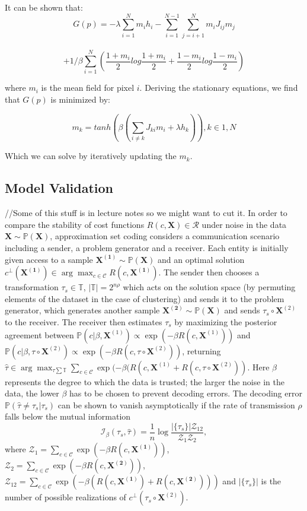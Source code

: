 \documentclass[9pt,parskip]{scrartcl}
\begin{document}
\begin{multicols*}{4}
 It can be shown that:
 $$G(p) = -\lambda \sum_{i=1}^N m_i h_i - \sum_{i=1}^{N-1} \sum_{j=i+1}^N m_i J_{ij} m_j$$ \\ $$+ 1/\beta \sum_{i=1}^N (\frac{1 + m_i}{2}log \frac{1 + m_i}{2} + \frac{1 - m_i}{2}log\frac{1 - m_i}{2})$$

where $m_i$ is the mean field for pixel $i$.
Deriving the stationary equations, we find that $G(p)$ is minimized by:
 
 $$m_k = tanh(\beta(\sum_{i\neq k} J_{ki} m_i + \lambda h_k)), k \in {1,N}$$
 
 Which we can solve by iteratively updating the $m_k$.
 
 \subsection*{Model Validation}
 //Some of this stuff is in lecture notes so we might want to cut it.
 In order to compare the stability of cost functions $R(c, \mathbf{X}) \in \mathcal{R}$ under noise in the data $\mathbf{X} \sim \mathbb{P}(\mathbf{X})$, approximation set coding considers a communication scenario including a sender, a problem generator and a receiver. Each entity is initially given access to a sample $\mathbf{X^{(1)}} \sim \mathbb{P}(\mathbf{X})$ and an optimal solution $c^\bot(\mathbf{X^{(1)}}) \in \arg \max_{c\in\mathcal{C}} R(c, \mathbf{X^{(1)}})$. The sender then chooses a transformation $\tau_s \in \mathbb{T}$, $|\mathbb{T}| = 2^{n\rho}$ which acts on the solution space (by permuting elements of the dataset in the case of clustering) and sends it to the problem generator, which generates another sample $\mathbf{X^{(2)}} \sim \mathbb{P}(\mathbf{X})$ and sends $\tau_s \circ \mathbf{X}^{(2)}$ to the receiver. The receiver then estimates $\tau_s$ by maximizing the posterior agreement between $\mathbb{P}(c|\beta, \mathbf{X}^{(1)}) \propto \exp(-\beta R(c,\mathbf{X}^{(1)}))$ and $\mathbb{P}(c|\beta, \tau \circ \mathbf{X}^{(2)}) \propto \exp(-\beta R(c,\tau \circ \mathbf{X}^{(2)}))$, returning $\hat\tau \in \arg \max_{\tau \sum \mathbb{T}} \sum_{c\in\mathcal{C}} \exp(-\beta(R(c,\mathbf{X}^{(1)} + R(c,\tau \circ \mathbf{X}^{(2)}))$. Here $\beta$ represents the degree to which the data is trusted; the larger the noise in the data, the lower $\beta$ has to be chosen to prevent decoding errors. The decoding error $\mathbb{P}(\hat\tau \neq \tau_s|\tau_s)$ can be shown to vanish asymptotically if the rate of transmission $\rho$ falls below the mutual information $$\mathcal{I}_\beta(\tau_s,\hat\tau) = \frac{1}{n} \log \frac{|\{\tau_s\}|\mathcal{Z}_{12}}{\mathcal{Z}_1 \mathcal{Z}_2},$$
where $\mathcal{Z}_1 = \sum_{c\in\mathcal{C}} \exp(-\beta R(c,\mathbf{X^{(1)}}))$, $\mathcal{Z}_2 = \sum_{c\in\mathcal{C}} \exp(-\beta R(c,\mathbf{X^{(2)}}))$, $\mathcal{Z}_{12} = \sum_{c\in\mathcal{C}} \exp(-\beta (R(c,\mathbf{X^{(1)}})+R(c,\mathbf{X^{(2)}})))$ and $|\{\tau_s\}|$ is the number of possible realizations of $c^\bot(\tau_s \circ \mathbf{X}^{(2)})$. 


\end{multicols*}
\end{document}
